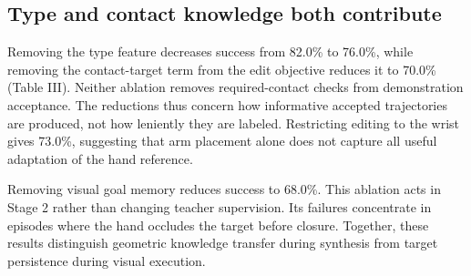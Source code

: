\documentclass[letterpaper,10pt,conference]{ieeeconf}
\begin{document}
\subsection{Type and contact knowledge both contribute}
\begin{table}[t]
\centering
\caption{HYPOTHETICAL RESULTS. Single-component removals at the same visual-data budget. Acceptance gates and the contact-feedback executor are retained in every condition.}
\label{tab:3}
\end{table}
Removing the type feature decreases success from 82.0\% to 76.0\%, while removing the contact-target term from the edit objective reduces it to 70.0\% (Table III). Neither ablation removes required-contact checks from demonstration acceptance. The reductions thus concern how informative accepted trajectories are produced, not how leniently they are labeled. Restricting editing to the wrist gives 73.0\%, suggesting that arm placement alone does not capture all useful adaptation of the hand reference.

Removing visual goal memory reduces success to 68.0\%. This ablation acts in Stage 2 rather than changing teacher supervision. Its failures concentrate in episodes where the hand occludes the target before closure. Together, these results distinguish geometric knowledge transfer during synthesis from target persistence during visual execution.
\end{document}

